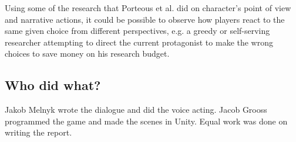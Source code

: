 Using some of the research that Porteous et al. \cite{Por} did on character's point of view and narrative actions, it could be possible to observe how players react to the same given choice from different perspectives, e.g. a greedy or self-serving researcher attempting to direct the current protagonist to make the wrong choices to save money on his research budget.

\subsection{Who did what?}
Jakob Melnyk wrote the dialogue and did the voice acting. Jacob Grooss programmed the game and made the scenes in Unity. Equal work was done on writing the report.